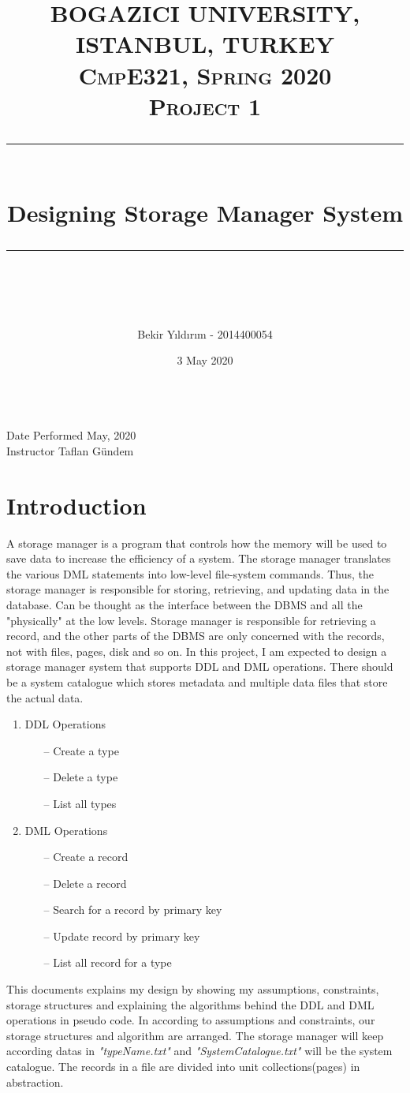 \documentclass{article}
\title{
\normalfont \normalsize 
\textsc{BOGAZICI UNIVERSITY, ISTANBUL, TURKEY \\ 
CmpE321, Spring 2020} \\
[10pt]
\textsc{\Large Project 1}
\rule{\linewidth}{0.5pt} \\[15pt] 
\huge Designing Storage Manager System \\
\rule{\linewidth}{2pt}  \\[30pt]
}
\author{Bekir Yıldırım - 2014400054}
\date{\normalsize 3 May 2020}
\newcounter{other}
\newcounter{late}
\begin{document}
\maketitle
\noindent
\textsc{} \\
[270pt]
Date Performed  May, 2020 \\
Instructor \dotfill Taflan Gündem \\

\tableofcontents{}

\break

\section{Introduction}
    A storage manager is a program that controls how the memory will be used to save data to increase the efficiency of a system. The storage manager translates the various DML statements into low-level file-system commands. Thus, the storage manager is responsible for storing, retrieving, and updating data in the database. Can be thought as the interface between the DBMS and all the "physically" at the low levels. Storage manager is responsible for retrieving a record, and the other parts of the DBMS are only concerned with the records, not with files, pages, disk and so on. In this project, I am expected to design a storage manager system that supports DDL and DML operations. There should be a system catalogue which stores metadata and multiple data files that store the actual data. 
    \begin{enumerate}
	\item DDL Operations
    \begin{enumerate}
    	\item[--] Create a type
        \item[--] Delete a type
        \item[--] List all types
    \end{enumerate}
    \item DML Operations
    \begin{enumerate}
    	\item[--] Create a record
        \item[--] Delete a record
        \item[--] Search for a record by primary key
        \item[--] Update record by primary key
        \item[--] List all record for a type
    \end{enumerate}
\end{enumerate}
This documents explains my design by showing my assumptions, constraints, storage structures and explaining the algorithms behind the DDL and DML operations in pseudo code. In according to assumptions and constraints, our storage structures and algorithm are arranged. The storage manager will keep according datas in \emph{"typeName.txt"} and \emph{"SystemCatalogue.txt"} will be the system catalogue. The records in a file are divided into unit collections(pages) in abstraction.
    
\end{document}

